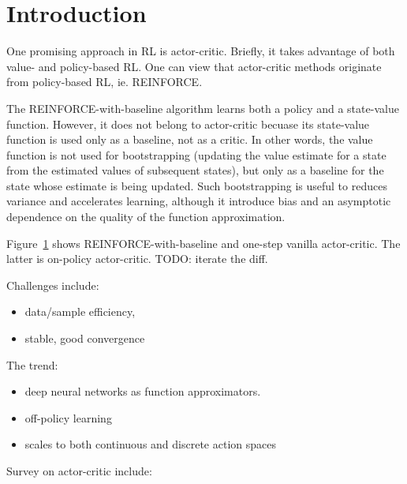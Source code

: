 \section{Introduction}

One promising approach in RL is actor-critic.
Briefly, it takes advantage of both value- and policy-based RL.
One can view that actor-critic methods originate from policy-based RL, ie. REINFORCE.

The REINFORCE-with-baseline algorithm learns both a policy and a state-value function.
However, it does not belong to actor-critic becuase
its state-value function is used only as a baseline, not as a critic.
In other words, the value function is not used for bootstrapping
(updating the value estimate for a state from the estimated values of subsequent states),
but only as a baseline for the state whose estimate is being updated.
Such bootstrapping is useful to reduces variance and accelerates learning,
although it introduce bias and an asymptotic dependence on
the quality of the function approximation.

Figure~\ref{} shows REINFORCE-with-baseline and one-step vanilla actor-critic.
The latter is on-policy actor-critic.
TODO: iterate the diff.

Challenges include:
\begin{itemize}
\item data/sample efficiency,
\item stable, good convergence
\end{itemize}

The trend:
\begin{itemize}
\item deep neural networks as function approximators.
\item off-policy learning
\item scales to both continuous and discrete action spaces
\end{itemize}

Survey on actor-critic include:
\cite{6392457}
